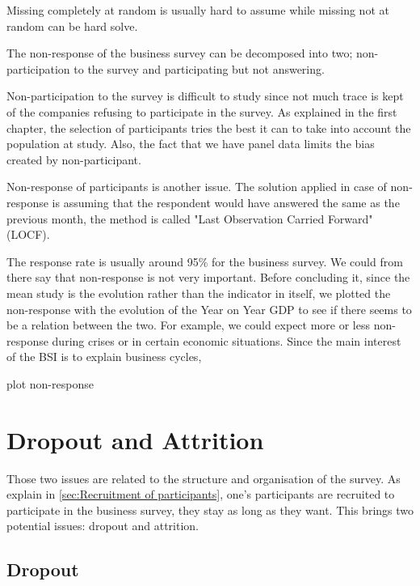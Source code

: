 \documentclass[12pt,a4paper,oneside]{book}
\begin{document}
Missing completely at random is usually hard to assume while missing not at random can be hard solve.


The non-response of the business survey can be decomposed into two; non-participation to the survey and participating but not answering.

Non-participation to the survey is difficult to study since not much trace is kept of the companies refusing to participate in the survey. As explained in the first chapter, the selection of participants tries the best it can to take into account the population at study. Also, the fact that we have panel data limits the bias created by non-participant.

Non-response of participants is another issue. 
The solution applied in case of non-response is assuming that the respondent would have answered the same as the previous month, the method is called "Last Observation Carried Forward" (LOCF).

The response rate is usually around 95\% for the business survey. We could from there say that non-response is not very important. 
Before concluding it, since the mean study is the evolution rather than the indicator in itself, we plotted the non-response with the evolution of the Year on Year GDP to see if there seems to be a relation between the two. For example, we could expect more or less non-response during crises or in certain economic situations. Since the main interest of the BSI is to explain business cycles,

plot non-response


\section{Dropout and Attrition}

Those two issues are related to the structure and organisation of the survey. As explain in \autoref{sec:Recruitment of participants}, one's participants are recruited to participate in the business survey, they stay as long as they want. This brings two potential issues: dropout and attrition.

\subsection{Dropout}
\end{document}
